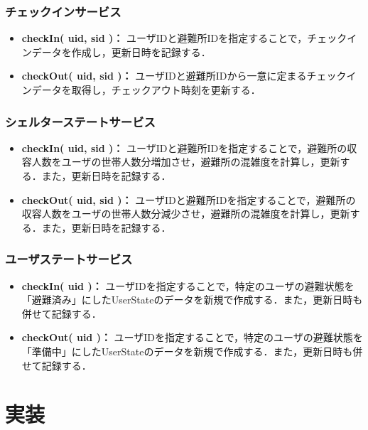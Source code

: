 \documentclass[technicalreport,dvipdfmx]{ieicej}
\begin{document}
\subsubsection{チェックインサービス}
\begin{itemize}
    \item{\textbf{checkIn( uid, sid )：}
         ユーザIDと避難所IDを指定することで，チェックインデータを作成し，更新日時を記録する．}
    \item{\textbf{checkOut( uid, sid )：}
         ユーザIDと避難所IDから一意に定まるチェックインデータを取得し，チェックアウト時刻を更新する．}
\end{itemize}

\subsubsection{シェルターステートサービス}
\begin{itemize}
     \item{\textbf{checkIn( uid, sid )：}
          ユーザIDと避難所IDを指定することで，避難所の収容人数をユーザの世帯人数分増加させ，避難所の混雑度を計算し，更新する．また，更新日時を記録する．}
     \item{\textbf{checkOut( uid, sid )：}
          ユーザIDと避難所IDを指定することで，避難所の収容人数をユーザの世帯人数分減少させ，避難所の混雑度を計算し，更新する．また，更新日時を記録する．}
\end{itemize}

\subsubsection{ユーザステートサービス}
\begin{itemize}
     \item{\textbf{checkIn( uid )：}
          ユーザIDを指定することで，特定のユーザの避難状態を「避難済み」にしたUserStateのデータを新規で作成する．また，更新日時も併せて記録する．}
     \item{\textbf{checkOut( uid )：}
          ユーザIDを指定することで，特定のユーザの避難状態を「準備中」にしたUserStateのデータを新規で作成する．また，更新日時も併せて記録する．}
\end{itemize}

\section{実装}
\end{document}
